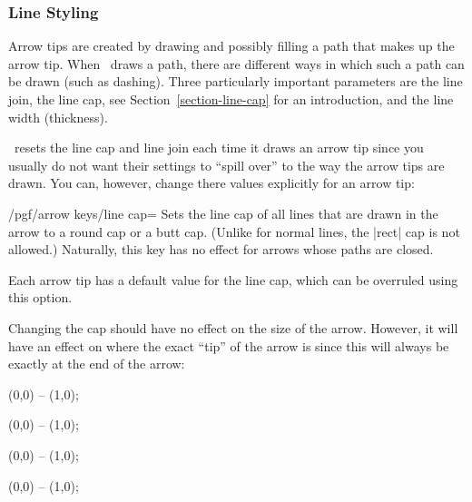 \subsubsection{Line Styling}
\label{section-arrow-key-caps}

Arrow tips are created by drawing and possibly filling a path that makes up the
arrow tip. When \tikzname\ draws a path, there are different ways in which such
a path can be drawn (such as dashing). Three particularly important parameters
are the line join, the line cap, see Section~\ref{section-line-cap} for an
introduction, and the line width (thickness).

\tikzname\ resets the line cap and line join each time it draws an arrow tip
since you usually do not want their settings to ``spill over'' to the way the
arrow tips are drawn. You can, however, change there values explicitly for an
arrow tip:

\begin{key}{/pgf/arrow keys/line cap=}
    Sets the line cap of all lines that are drawn in the arrow to a round cap
    or a butt cap. (Unlike for normal lines, the |rect| cap is not allowed.)
    Naturally, this key has no effect for arrows whose paths are closed.

    Each arrow tip has a default value for the line cap, which can be overruled
    using this option.

    Changing the cap should have no effect on the size of the arrow. However,
    it will have an effect on where the exact ``tip'' of the arrow is since
    this will always be exactly at the end of the arrow:
\begin{codeexample}[width=3cm,preamble={\usetikzlibrary{arrows.meta}}]
\tikz [line width=2mm]
  \draw [arrows = {-Computer Modern Rightarrow[line cap=butt]}]
        (0,0) -- (1,0);
\end{codeexample}
\begin{codeexample}[width=3cm,preamble={\usetikzlibrary{arrows.meta}}]
\tikz [line width=2mm]
  \draw [arrows = {-Computer Modern Rightarrow[line cap=round]}]
        (0,0) -- (1,0);
\end{codeexample}
\begin{codeexample}[width=3cm,preamble={\usetikzlibrary{arrows.meta}}]
\tikz [line width=2mm]
  \draw [arrows = {-Bracket[reversed,line cap=butt]}]
        (0,0) -- (1,0);
\end{codeexample}
\begin{codeexample}[width=3cm,preamble={\usetikzlibrary{arrows.meta}}]
\tikz [line width=2mm]
  \draw [arrows = {-Bracket[reversed,line cap=round]}]
        (0,0) -- (1,0);
\end{codeexample}
\end{key}

